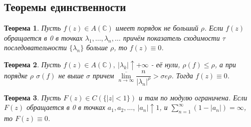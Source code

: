 \documentclass[9pt]{article}
\newtheorem{theorem}{Теорема} %
\begin{document}
		\subsection*{Теоремы единственности}
			\begin{theorem}
				Пусть $f(z) \in A(\mathbb{C})$ имеет порядок не больший $\rho$. Если $f(z)$ обращается в 0 в точках $\lambda_1, \dots, \lambda_n, \dots$ причём показатель сходимости $\tau$ последовательности $\{\lambda_n\}$ больше $\rho$, то $f(z) \equiv 0$.
			\end{theorem}
			\begin{theorem}
				Пусть $f(z) \in A(\mathbb{C}), \ |\lambda_k| \uparrow +\infty$ - её нули, $\rho(f) \leq \rho$, а при порядке $\rho$ $\sigma(f)$ не выше $\sigma$ причем $\overline{\lim\limits_{n\to\infty}}\dfrac{n}{|\lambda_n|^\rho} > \sigma e \rho$. Тогда $f(z) \equiv 0$.			
			\end{theorem}
			\begin{theorem}
				Пусть $F(z) \in C(\{|z| < 1\})$ и там по модулю ограничена. Если $F(z)$ обращается в 0 в точках $a_1, a_2, \dots, \ |a_n| \uparrow 1$, и $\sum\limits_{n=1}^{\infty} (1 - |a_n|) = \infty$, то $F(z) \equiv 0$.
			\end{theorem}
\end{document}

